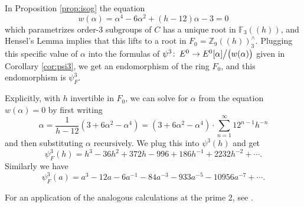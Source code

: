 \documentclass{gtpart}
\theoremstyle{definition}
\theoremstyle{remark}
\def\co{\colon\thinspace}
\newcommand{\mb}[1]{\mathbb{#1}}
\newcommand{\BF}{{\mb F}}
\newcommand{\BZ}{{\mb Z}}
\newcommand{\A}{\alpha}
\newcommand{\p}{\psi^3}
\begin{document}
In Proposition \ref{prop:isog} the equation 
\[
 w(\A) = \A^4 - 6 \A^2 + (h - 12) \A - 3 = 0 
\]
which parametrizes order-3 subgroups of $C$ has a unique root 
in $\BF_3 (\!(h)\!)$, and Hensel's Lemma implies that this lifts to a 
root in $F_0 = \BZ_9 (\!(h)\!)_3^\wedge$.  Plugging this 
specific value of $\A$ into the formulas of $\p \co E^0 \to E^0 [\A] \big/ \big( w(\A) \big)$ given in Corollary \ref{cor:psi3}, we 
get an endomorphism of the ring $F_0$, and this endomorphism is $\psi_F^3$.  

Explicitly, with $h$ invertible in $F_0$, we can solve for $\A$ from the equation $w(\A) = 0$ by first writing 
\[
 \A = \frac{1}{h - 12} (3 + 6 \A^2 - \A^4) = (3 + 6 \A^2 - \A^4) \cdot \sum_{n = 1}^\infty 12^{n-1} h^{-n} 
\]
and then substituting $\A$ recursively.  We plug this into $\p(h)$ and get 
\[
 \psi_F^3(h) = h^3 - 36 h^2 + 372 h - 996 + 186 h^{-1} + 2232 h^{-2} + \cdots.  
\]
Similarly we have 
\[
 \psi_F^3(a) = a^3 - 12 a - 6 a^{-1} - 84 a^{-3} - 933 a^{-5} - 10956 a^{-7} + \cdots.  
\]

For an application of the analogous calculations at the prime 2, see \cite[Section 8.2]{level3}.  


\newpage

%
%
\end{document}
